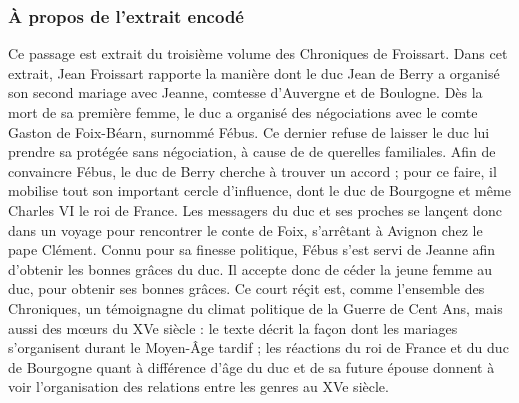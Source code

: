 \documentclass[12pt, a4paper]{article}
\begin{document}
	\subsubsection{À propos de l'extrait encodé}
	Ce passage est extrait du troisième volume des Chroniques de Froissart. Dans cet extrait, Jean Froissart rapporte la manière
	dont le duc Jean de Berry a organisé son second mariage avec Jeanne, comtesse d’Auvergne et de Boulogne.
	Dès la mort de sa première femme, le duc a organisé des négociations avec le comte Gaston de Foix-Béarn, surnommé Fébus. Ce dernier refuse de laisser
	le duc lui prendre sa protégée sans négociation, à cause de de querelles familiales. Afin de convaincre Fébus, le duc de Berry cherche à trouver
	un accord ; pour ce faire, il mobilise tout son important cercle d'influence, dont le duc de Bourgogne et même Charles VI le roi de France. Les messagers du duc et ses proches se lançent donc dans un voyage pour rencontrer le conte de Foix, s'arrêtant à Avignon chez le pape Clément. Connu pour
	sa finesse politique, Fébus s'est servi de Jeanne
	afin d'obtenir les bonnes grâces du duc. Il accepte donc de céder la jeune femme au duc, pour obtenir ses bonnes grâces. Ce court réçit est, comme l'ensemble des Chroniques, un témoignagne du climat politique de la Guerre de Cent Ans, mais aussi des mœurs du XVe siècle : le texte décrit 
	la façon dont les mariages s'organisent durant le Moyen-Âge tardif ; les réactions du roi de France et du duc de Bourgogne quant à différence d'âge du duc et de sa future
	épouse donnent à voir l'organisation des relations entre les genres au XVe siècle.
	
\end{document}
